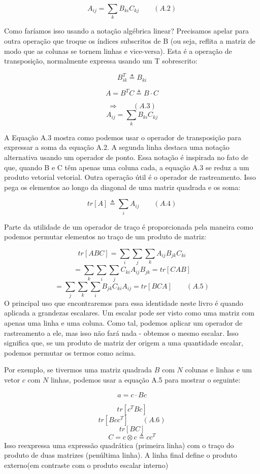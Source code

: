 \documentclass[
  12pt,
]{book}
\begin{document}
\[ A_{ij} = \sum_k B_{ki} C_{kj} \qquad (A.2) \]

Como faríamos isso usando a notação algébrica linear? Precisamos apelar para outra operação que troque os índices subscritos de B (ou seja, reflita a matriz de modo que as colunas se tornem linhas e vice-versa). Esta é a operação de transposição, normalmente expressa usando um T sobrescrito:

\[B_{ik}^T \triangleq B_{ki}\]

\[A=B^TC \triangleq B \cdot C\]

\[ \Longrightarrow \qquad (A.3)\]
\[A_{ij} = \sum_k B_{ki}C_{kj}\]

A Equação A.3 mostra como podemos usar o operador de transposição para expressar a soma da equação A.2. A segunda linha destaca uma notação alternativa usando um operador de ponto. Essa notação é inspirada no fato de que, quando B e C têm apenas uma coluna cada, a equação A.3 se reduz a um produto vetorial vetorial.
Outra operação útil é o operador de rastreamento. Isso pega os elementos ao longo da diagonal de uma matriz quadrada e os soma:

\[ tr[A] \triangleq \sum_i A_{ij} \qquad (A.4)\]

Parte da utilidade de um operador de traço é proporcionada pela maneira como podemos permutar elementos no traço de um produto de matriz:

\[ tr[ABC] = \sum_i \sum_j \sum_k A_{ij} B_{jk} C_{ki}\]
\[ = \sum_k \sum_i \sum_j C_{ki} A_{ij} B_{jk} = tr[CAB] \]
\[ = \sum_j \sum_k \sum_i B_{jk} C_{ki} A_{ij} = tr[BCA] \qquad (A.5) \]
O principal uso que encontraremos para essa identidade neste livro é quando aplicada a grandezas escalares. Um escalar pode ser visto como uma matriz com apenas uma linha e uma coluna. Como tal, podemos aplicar um operador de rastreamento a ele, mas isso não fará nada - obtemos o mesmo escalar. Isso significa que, se um produto de matriz der origem a uma quantidade escalar, podemos permutar os termos como acima.

Por exemplo, se tivermos uma matriz quadrada \(B\) com \(N\) colunas e linhas e um vetor \(c\) com \(N\) linhas, podemos usar a equação A.5 para mostrar o seguinte:

\[ a = c \cdot Bc\]

\[ tr[c^T Bc] \]
\[ tr[Bcc^T] \qquad (A.6)\]
\[ tr[BC]\]
\[ C = c \otimes c \triangleq cc^T  \]
Isso reexpressa uma expressão quadrática (primeira linha) com o traço do produto de duas matrizes (penúltima linha). A linha final define o produto externo(em contraste com o produto escalar interno)
\end{document}
